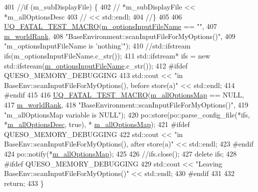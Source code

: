 \begin{DoxyCode}
401   \textcolor{comment}{//if (m\_subDisplayFile) \{}
402   \textcolor{comment}{//  *m\_subDisplayFile << *m\_allOptionsDesc}
403   \textcolor{comment}{//                    << std::endl;}
404   \textcolor{comment}{//\}}
405 
406   \hyperlink{_defines_8h_a56d63d18d0a6d45757de47fcc06f574d}{UQ\_FATAL\_TEST\_MACRO}(\hyperlink{class_q_u_e_s_o_1_1_base_environment_a37195909442a817980e1cf8392b9e63d}{m\_optionsInputFileName} == \textcolor{stringliteral}{""},
407                       \hyperlink{class_q_u_e_s_o_1_1_base_environment_a464cab923ada0e14c6e3a4000c2ea385}{m\_worldRank},
408                       \textcolor{stringliteral}{"BaseEnvironment::scanInputFileForMyOptions()"},
409                       \textcolor{stringliteral}{"m\_optionsInputFileName is 'nothing'"});
410   \textcolor{comment}{//std::ifstream ifs(m\_optionsInputFileName.c\_str());}
411   std::ifstream* ifs = \textcolor{keyword}{new} std::ifstream(\hyperlink{class_q_u_e_s_o_1_1_base_environment_a37195909442a817980e1cf8392b9e63d}{m\_optionsInputFileName}.c\_str());
412 \textcolor{preprocessor}{#ifdef QUESO\_MEMORY\_DEBUGGING}
413 \textcolor{preprocessor}{}  std::cout << \textcolor{stringliteral}{"in BaseEnv::scanInputFileForMyOptions(), before store(a)"} << std::endl;
414 \textcolor{preprocessor}{#endif}
415 \textcolor{preprocessor}{}
416   \hyperlink{_defines_8h_a56d63d18d0a6d45757de47fcc06f574d}{UQ\_FATAL\_TEST\_MACRO}(\hyperlink{class_q_u_e_s_o_1_1_base_environment_a2d8e668313b18f57e4607c3bec1ecda2}{m\_allOptionsMap} == NULL,
417                       \hyperlink{class_q_u_e_s_o_1_1_base_environment_a464cab923ada0e14c6e3a4000c2ea385}{m\_worldRank},
418                       \textcolor{stringliteral}{"BaseEnvironment::scanInputFileForMyOptions()"},
419                       \textcolor{stringliteral}{"m\_allOptionsMap variable is NULL"});
420   po::store(po::parse\_config\_file(*ifs, *\hyperlink{class_q_u_e_s_o_1_1_base_environment_aac5465b02be108536bda1b5627456c97}{m\_allOptionsDesc}, \textcolor{keyword}{true}), *
      \hyperlink{class_q_u_e_s_o_1_1_base_environment_a2d8e668313b18f57e4607c3bec1ecda2}{m\_allOptionsMap});
421 \textcolor{preprocessor}{#ifdef QUESO\_MEMORY\_DEBUGGING}
422 \textcolor{preprocessor}{}  std::cout << \textcolor{stringliteral}{"in BaseEnv::scanInputFileForMyOptions(), after store(a)"} << std::endl;
423 \textcolor{preprocessor}{#endif}
424 \textcolor{preprocessor}{}  po::notify(*\hyperlink{class_q_u_e_s_o_1_1_base_environment_a2d8e668313b18f57e4607c3bec1ecda2}{m\_allOptionsMap});
425 
426   \textcolor{comment}{//ifs.close();}
427   \textcolor{keyword}{delete} ifs;
428 \textcolor{preprocessor}{#ifdef QUESO\_MEMORY\_DEBUGGING}
429 \textcolor{preprocessor}{}  std::cout << \textcolor{stringliteral}{"Leaving BaseEnv::scanInputFileForMyOptions()"} << std::endl;
430 \textcolor{preprocessor}{#endif}
431 \textcolor{preprocessor}{}
432   \textcolor{keywordflow}{return};
433 \}
\end{DoxyCode}
